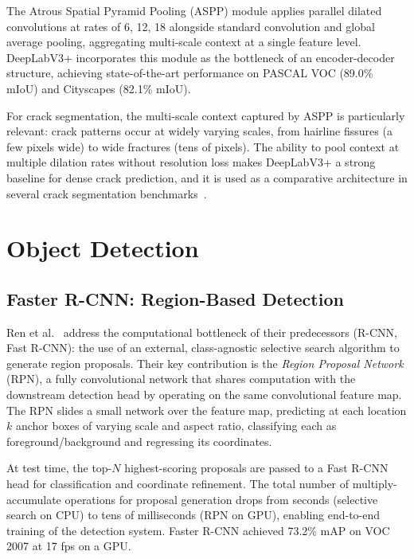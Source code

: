 \documentclass[12pt,a4paper]{article}
\begin{document}
The Atrous Spatial Pyramid Pooling (ASPP) module applies parallel dilated convolutions at rates of 6, 12, 18 alongside standard convolution and global average pooling, aggregating multi-scale context at a single feature level. DeepLabV3+ incorporates this module as the bottleneck of an encoder-decoder structure, achieving state-of-the-art performance on PASCAL VOC (89.0\% mIoU) and Cityscapes (82.1\% mIoU).

For crack segmentation, the multi-scale context captured by ASPP is particularly relevant: crack patterns occur at widely varying scales, from hairline fissures (a few pixels wide) to wide fractures (tens of pixels). The ability to pool context at multiple dilation rates without resolution loss makes DeepLabV3+ a strong baseline for dense crack prediction, and it is used as a comparative architecture in several crack segmentation benchmarks~\cite{surv:liu2019deepcrack}.

\section{Object Detection}
\label{surv:sec:detection}

\subsection{Faster R-CNN: Region-Based Detection}

Ren et al.~\cite{ren2015faster} address the computational bottleneck of their predecessors (R-CNN, Fast R-CNN): the use of an external, class-agnostic selective search algorithm to generate region proposals. Their key contribution is the \textit{Region Proposal Network} (RPN), a fully convolutional network that shares computation with the downstream detection head by operating on the same convolutional feature map. The RPN slides a small network over the feature map, predicting at each location $k$ anchor boxes of varying scale and aspect ratio, classifying each as foreground/background and regressing its coordinates.

At test time, the top-$N$ highest-scoring proposals are passed to a Fast R-CNN head for classification and coordinate refinement. The total number of multiply-accumulate operations for proposal generation drops from seconds (selective search on CPU) to tens of milliseconds (RPN on GPU), enabling end-to-end training of the detection system. Faster R-CNN achieved 73.2\% mAP on VOC 2007 at 17 fps on a GPU.
\end{document}
